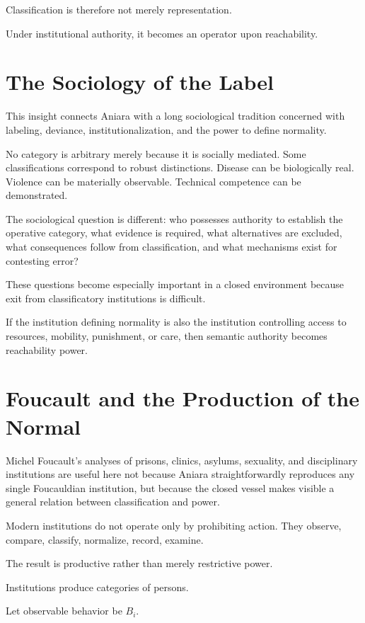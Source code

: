 \documentclass[11pt,oneside]{book}
\theoremstyle{definition}
\theoremstyle{remark}
\begin{document}
Classification is therefore not merely representation.

Under institutional authority, it becomes an operator upon reachability.

\section{The Sociology of the Label}

This insight connects Aniara with a long sociological tradition concerned with labeling, deviance, institutionalization, and the power to define normality.

No category is arbitrary merely because it is socially mediated. Some classifications correspond to robust distinctions. Disease can be biologically real. Violence can be materially observable. Technical competence can be demonstrated.

The sociological question is different: who possesses authority to establish the operative category, what evidence is required, what alternatives are excluded, what consequences follow from classification, and what mechanisms exist for contesting error?

These questions become especially important in a closed environment because exit from classificatory institutions is difficult.

If the institution defining normality is also the institution controlling access to resources, mobility, punishment, or care, then semantic authority becomes reachability power.

\section{Foucault and the Production of the Normal}

Michel Foucault's analyses of prisons, clinics, asylums, sexuality, and disciplinary institutions are useful here not because Aniara straightforwardly reproduces any single Foucauldian institution, but because the closed vessel makes visible a general relation between classification and power.

Modern institutions do not operate only by prohibiting action. They observe, compare, classify, normalize, record, examine.

The result is productive rather than merely restrictive power.

Institutions produce categories of persons.

Let observable behavior be \(B_i\).
\end{document}
